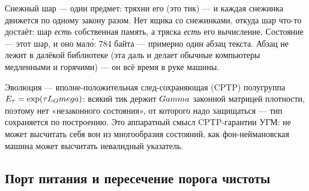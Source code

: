 \begin{zerobox}
Снежный шар --- один предмет: тряхни его (это тик) --- и каждая снежинка
движется по одному закону разом. Нет ящика со снежинками, откуда шар что-то
достаёт: шар \emph{есть} собственная память, а тряска \emph{есть} его
вычисление. Состояние \TALOS{} --- этот шар, и оно мало́: $784$ байта ---
примерно один абзац текста. Абзац не лежит в далёкой библиотеке (эта даль и
делает обычные компьютеры медленными и горячими) --- он всё время в руке
машины.
\end{zerobox}

Эволюция --- вполне-положительная след-сохраняющая (CPTP) полугруппа
$E_\tau=\exp(\tau L_Omega)$: всякий тик держит $Gamma$ законной
матрицей плотности, поэтому нет «незаконного состояния», от которого надо
защищаться --- тип сохраняется по построению. Это аппаратный смысл CPTP-гарантии
УГМ: \TALOS{} не может высчитать себя вон из многообразия состояний, как
фон-неймановская машина может высчитать невалидный указатель.

\subsection{Порт питания и пересечение порога чистоты}
\label{subsec:powerport}

